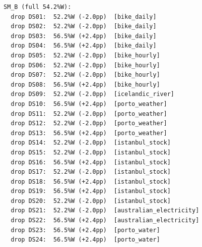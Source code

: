 \begin{verbatim}
  SM_B (full 54.2%W):
    drop DS01:  52.2%W (-2.0pp)  [bike_daily]
    drop DS02:  52.2%W (-2.0pp)  [bike_daily]
    drop DS03:  56.5%W (+2.4pp)  [bike_daily]
    drop DS04:  56.5%W (+2.4pp)  [bike_daily]
    drop DS05:  52.2%W (-2.0pp)  [bike_hourly]
    drop DS06:  52.2%W (-2.0pp)  [bike_hourly]
    drop DS07:  52.2%W (-2.0pp)  [bike_hourly]
    drop DS08:  56.5%W (+2.4pp)  [bike_hourly]
    drop DS09:  52.2%W (-2.0pp)  [icelandic_river]
    drop DS10:  56.5%W (+2.4pp)  [porto_weather]
    drop DS11:  52.2%W (-2.0pp)  [porto_weather]
    drop DS12:  52.2%W (-2.0pp)  [porto_weather]
    drop DS13:  56.5%W (+2.4pp)  [porto_weather]
    drop DS14:  52.2%W (-2.0pp)  [istanbul_stock]
    drop DS15:  52.2%W (-2.0pp)  [istanbul_stock]
    drop DS16:  56.5%W (+2.4pp)  [istanbul_stock]
    drop DS17:  52.2%W (-2.0pp)  [istanbul_stock]
    drop DS18:  56.5%W (+2.4pp)  [istanbul_stock]
    drop DS19:  56.5%W (+2.4pp)  [istanbul_stock]
    drop DS20:  52.2%W (-2.0pp)  [istanbul_stock]
    drop DS21:  52.2%W (-2.0pp)  [australian_electricity]
    drop DS22:  56.5%W (+2.4pp)  [australian_electricity]
    drop DS23:  56.5%W (+2.4pp)  [porto_water]
    drop DS24:  56.5%W (+2.4pp)  [porto_water]

\end{verbatim}
\endgroup
